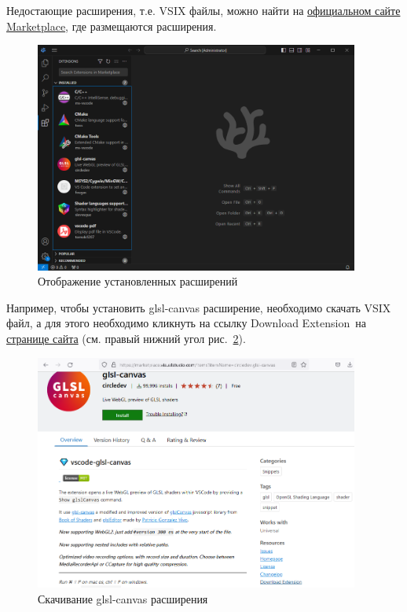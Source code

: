 \documentclass[a4paper,12pt]{article}
\begin{document}
Недостающие расширения, т.е. VSIX файлы, можно найти на \href{https://marketplace.visualstudio.com/vscode}{официальном сайте Marketplace}, где размещаются расширения.

\begin{figure}[H]
	\centering
	\includegraphics[width=0.95\textwidth]{images/Installed_extenstions.png}
	\caption {Отображение установленных расширений}
	\label{fig:installed_extensions}
\end{figure}

Например, чтобы установить glsl-canvas расширение, необходимо скачать VSIX файл, а для этого необходимо кликнуть на ссылку \textquotedbl Download Extension\textquotedbl \ на \href{https://marketplace.visualstudio.com/items?itemName=circledev.glsl-canvas}{странице сайта} (см. правый нижний угол рис.~\ref{fig:Downloading_glsl-canvas}).


\begin{figure}[H]
	\centering
	\includegraphics[width=0.95\textwidth]{images/Downloading_glsl-canvas.png}
	\caption {Скачивание glsl-canvas расширения}
	\label{fig:Downloading_glsl-canvas}
\end{figure}
\end{document}
